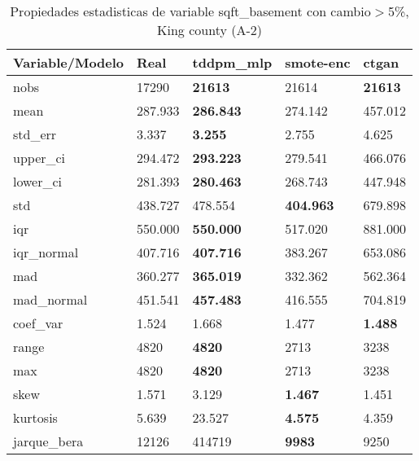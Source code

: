 \begin{table}[H]
\centering
\fontsize{8}{14}\selectfont
\caption{Propiedades estadisticas de variable sqft\_basement con cambio\ensuremath{>}5\%, King county (A-2)}
\label{table-stats-king county-a-2-sqft_basement-short}
\begin{tabular}{|l|m{10em}|m{10em}|m{10em}|m{10em}|}
\hline
 \rowcolor[gray]{0.8}
Variable/Modelo & Real & tddpm\_mlp & smote-enc & ctgan \\
\hline nobs & 17290 & \bfseries 21613 & \cellcolor[rgb]{0.9, 0.54, 0.52} 21614 & \bfseries 21613 \\
\hline mean & 287.933 & \bfseries 286.843 & 274.142 & \cellcolor[rgb]{0.9, 0.54, 0.52} 457.012 \\
\hline std\_err & 3.337 & \bfseries 3.255 & 2.755 & \cellcolor[rgb]{0.9, 0.54, 0.52} 4.625 \\
\hline upper\_ci & 294.472 & \bfseries 293.223 & 279.541 & \cellcolor[rgb]{0.9, 0.54, 0.52} 466.076 \\
\hline lower\_ci & 281.393 & \bfseries 280.463 & 268.743 & \cellcolor[rgb]{0.9, 0.54, 0.52} 447.948 \\
\hline std & 438.727 & 478.554 & \bfseries 404.963 & \cellcolor[rgb]{0.9, 0.54, 0.52} 679.898 \\
\hline iqr & 550.000 & \bfseries 550.000 & 517.020 & \cellcolor[rgb]{0.9, 0.54, 0.52} 881.000 \\
\hline iqr\_normal & 407.716 & \bfseries 407.716 & 383.267 & \cellcolor[rgb]{0.9, 0.54, 0.52} 653.086 \\
\hline mad & 360.277 & \bfseries 365.019 & 332.362 & \cellcolor[rgb]{0.9, 0.54, 0.52} 562.364 \\
\hline mad\_normal & 451.541 & \bfseries 457.483 & 416.555 & \cellcolor[rgb]{0.9, 0.54, 0.52} 704.819 \\
\hline coef\_var & 1.524 & \cellcolor[rgb]{0.9, 0.54, 0.52} 1.668 & 1.477 & \bfseries 1.488 \\
\hline range & 4820 & \bfseries 4820 & \cellcolor[rgb]{0.9, 0.54, 0.52} 2713 & 3238 \\
\hline max & 4820 & \bfseries 4820 & \cellcolor[rgb]{0.9, 0.54, 0.52} 2713 & 3238 \\
\hline skew & 1.571 & \cellcolor[rgb]{0.9, 0.54, 0.52} 3.129 & \bfseries 1.467 & 1.451 \\
\hline kurtosis & 5.639 & \cellcolor[rgb]{0.9, 0.54, 0.52} 23.527 & \bfseries 4.575 & 4.359 \\
\hline jarque\_bera & 12126 & \cellcolor[rgb]{0.9, 0.54, 0.52} 414719 & \bfseries 9983 & 9250 \\

\end{tabular}
\end{table}
